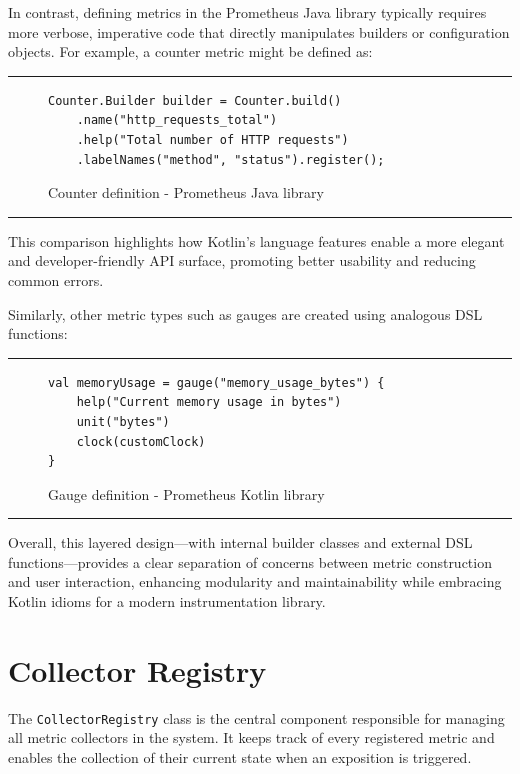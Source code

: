 In contrast, defining metrics in the Prometheus Java library typically requires more verbose, imperative code that
directly manipulates
builders or configuration objects.
For example, a counter metric might be defined as:


\noindent\rule{\linewidth}{0.4pt}

\begin{figure}[h]
    \begin{lstlisting}
Counter.Builder builder = Counter.build()
    .name("http_requests_total")
    .help("Total number of HTTP requests")
    .labelNames("method", "status").register();
    \end{lstlisting}
    \caption{Counter definition - Prometheus Java library}
\end{figure}

\noindent\rule{\linewidth}{0.4pt}


This comparison highlights how Kotlin’s language features enable a more elegant and developer-friendly \ac{API}
surface, promoting better usability and reducing common errors.

Similarly, other metric types such as gauges are created using analogous \ac{DSL} functions:


\noindent\rule{\linewidth}{0.4pt}

\begin{figure}[h]
    \begin{lstlisting}
val memoryUsage = gauge("memory_usage_bytes") {
    help("Current memory usage in bytes")
    unit("bytes")
    clock(customClock)
}
    \end{lstlisting}
    \caption{Gauge definition - Prometheus Kotlin library}
\end{figure}

\noindent\rule{\linewidth}{0.4pt}


Overall, this layered design—with internal builder classes and external \ac{DSL} functions—provides a clear separation
of concerns between metric construction and user interaction, enhancing modularity and maintainability while embracing Kotlin idioms for a modern instrumentation library.


\section{Collector Registry}\label{sec:collector-registry}

The \texttt{CollectorRegistry} class is the central component responsible for managing all metric collectors in the system.
It keeps track of every registered metric and enables the collection of their current state when an exposition is triggered.


